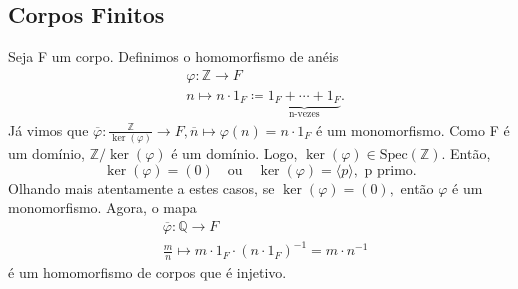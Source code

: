 \documentclass{article}
\begin{document}
\subsection{Corpos Finitos}
  Seja F um corpo. Definimos o homomorfismo de anéis
\begin{align*}
  &\varphi :\mathbb{Z}\rightarrow F\\
  &n\mapsto n \cdot 1_{F}\coloneqq \underbrace{1_{F} + \cdots + 1_{F}}_{\text{n-vezes}}.
\end{align*}
Já vimos que \(\overline{\varphi }:\frac{\mathbb{Z}}{\ker{(\varphi )}}\rightarrow F, \overline{n}\mapsto \varphi (n)=n \cdot 1_{F}\) é um monomorfismo. Como F é um
domínio, \(\mathbb{Z}/\ker{(\varphi )}\) é um domínio. Logo, \(\ker{(\varphi )}\in \mathrm{Spec}(\mathbb{Z}).\) Então, 
  \[
    \ker{(\varphi )} = (0)\quad\text{ou}\quad \ker{(\varphi )}=\langle p \rangle,\text{ p primo.}
  \]
  Olhando mais atentamente a estes casos, se \(\ker{(\varphi )} = (0),\) então \(\varphi \) é um monomorfismo. Agora, 
o mapa 
 \begin{align*}
   &\overline{\varphi }:\mathbb{Q}\rightarrow F\\
   &\frac{m}{n}\mapsto m \cdot 1_{F} \cdot (n \cdot 1_{F})^{-1} = m \cdot n^{-1}
 \end{align*}
é um homomorfismo de corpos que é injetivo.
\end{document}
